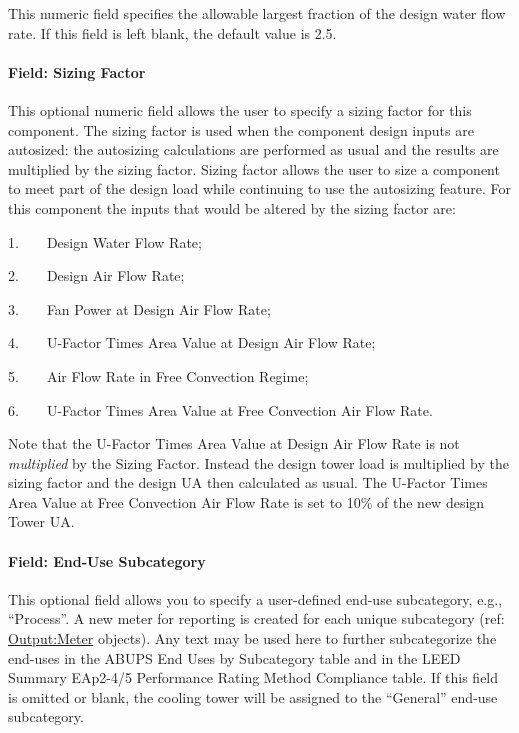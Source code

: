 This numeric field specifies the allowable largest fraction of the design water flow rate. If this field is left blank, the default value is 2.5.

\paragraph{Field: Sizing Factor}\label{sizing-factor-01}

This optional numeric field allows the user to specify a sizing factor for this component. The sizing factor is used when the component design inputs are autosized: the autosizing calculations are performed as usual and the results are multiplied by the sizing factor. Sizing factor allows the user to size a component to meet part of the design load while continuing to use the autosizing feature. For this component the inputs that would be altered by the sizing factor are:

1.~~~~Design Water Flow Rate;

2.~~~~Design Air Flow Rate;

3.~~~~Fan Power at Design Air Flow Rate;

4.~~~~U-Factor Times Area Value at Design Air Flow Rate;

5.~~~~Air Flow Rate in Free Convection Regime;

6.~~~~U-Factor Times Area Value at Free Convection Air Flow Rate.

Note that the U-Factor Times Area Value at Design Air Flow Rate is not \emph{multiplied} by the Sizing Factor. Instead the design tower load is multiplied by the sizing factor and the design UA then calculated as usual. The U-Factor Times Area Value at Free Convection Air Flow Rate is set to 10\% of the new design Tower UA.

\paragraph{Field: End-Use Subcategory}\label{end-use-subcategory-01}

This optional field allows you to specify a user-defined end-use subcategory, e.g., ``Process''. A new meter for reporting is created for each unique subcategory (ref: \hyperref[outputmeter-and-outputmetermeterfileonly]{Output:Meter} objects). Any text may be used here to further subcategorize the end-uses in the ABUPS End Uses by Subcategory table and in the LEED Summary EAp2-4/5 Performance Rating Method Compliance table. If this field is omitted or blank, the cooling tower will be assigned to the ``General'' end-use subcategory.


